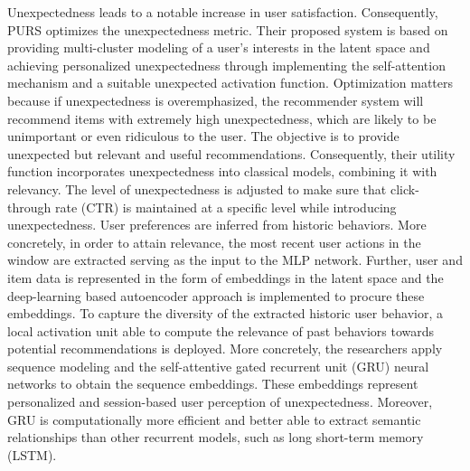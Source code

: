 Unexpectedness leads to a notable increase in user satisfaction. Consequently, PURS optimizes the unexpectedness metric. Their proposed system is based on providing multi-cluster modeling of a user’s interests in the latent space and achieving personalized unexpectedness through implementing the self-attention mechanism and a suitable unexpected activation function. Optimization matters because if unexpectedness is overemphasized, the
recommender system will recommend items with extremely high unexpectedness, which are likely to be unimportant or even ridiculous to the user. The objective is to provide unexpected but relevant and useful recommendations. Consequently, their utility function incorporates unexpectedness into classical models, combining it with relevancy. The level of unexpectedness is adjusted to make sure that click-through rate (CTR) is maintained at a specific level while introducing unexpectedness. 
User preferences are inferred from historic behaviors. More concretely, in order to attain relevance, the most recent user actions in the window are extracted serving as the input to the MLP network. Further, user and item data is represented in the form of embeddings in the latent space and the deep-learning based autoencoder approach is implemented to procure these embeddings. 
To capture the diversity of the extracted historic user behavior,  a local activation unit able to compute the relevance of past behaviors towards potential recommendations is deployed. More concretely, the researchers apply sequence modeling and the self-attentive gated recurrent unit (GRU) neural networks to obtain the sequence embeddings. These embeddings represent personalized and session-based user perception of unexpectedness. Moreover, GRU is computationally more efficient and better able to extract semantic relationships than other recurrent models, such as long short-term memory (LSTM).
